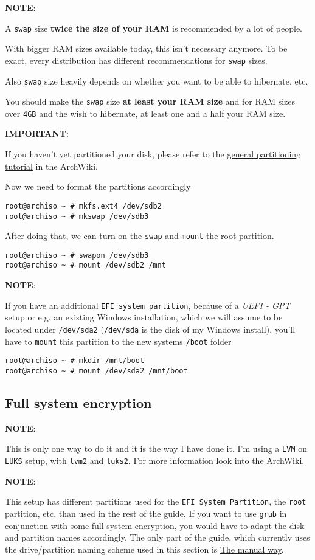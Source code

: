 \documentclass[9pt]{report}
\newcommand{\admonition}[2]{\textbf{#1}: {#2}}
\begin{document}
\admonition{NOTE}{A \texttt{swap} size \textbf{twice the size of your RAM} is recommended by a lot of people.


With bigger RAM sizes available today, this isn’t necessary anymore.
To be exact, every distribution has different recommendations for \texttt{swap} sizes.


Also \texttt{swap} size heavily depends on whether you want to be able to hibernate, etc.


You should make the \texttt{swap} size \textbf{at least your RAM size} and for RAM sizes over \texttt{4GB} and the wish to hibernate, at least one and a half your RAM size.

}
\admonition{IMPORTANT}{If you haven’t yet partitioned your disk, please refer to the \href{https://wiki.archlinux.org/index.php/Partitioning}{general partitioning tutorial} in the ArchWiki.

}
Now we need to format the partitions accordingly


\begin{verbatim}
root@archiso ~ # mkfs.ext4 /dev/sdb2
root@archiso ~ # mkswap /dev/sdb3
\end{verbatim}

After doing that, we can turn on the \texttt{swap} and \texttt{mount} the root partition.


\begin{verbatim}
root@archiso ~ # swapon /dev/sdb3
root@archiso ~ # mount /dev/sdb2 /mnt
\end{verbatim}

\admonition{NOTE}{If you have an additional \texttt{EFI system partition}, because of a \emph{UEFI - GPT} setup or e.g. an existing Windows installation, which we will assume to be located under \texttt{/dev/sda2} (\texttt{/dev/sda} is the disk of my Windows install), you’ll have to \texttt{mount} this partition to the new systems \texttt{/boot} folder


}
\begin{verbatim}
root@archiso ~ # mkdir /mnt/boot
root@archiso ~ # mount /dev/sda2 /mnt/boot
\end{verbatim}

\vfill\eject

\hypertarget{x-full-system-encryption}{\subsection{Full system encryption}}
\admonition{NOTE}{This is only one way to do it and it is the way I have done it.
I’m using a \texttt{LVM} on \texttt{LUKS} setup, with \texttt{lvm2} and \texttt{luks2}.
For more information look into the \href{https://wiki.archlinux.org/}{ArchWiki}.

}
\admonition{NOTE}{This setup has different partitions used for the \texttt{EFI System Partition}, the \texttt{root} partition, etc. than used in the rest of the guide.
If you want to use \texttt{grub} in conjunction with some full system encryption, you would have to adapt the disk and partition names accordingly.
The only part of the guide, which currently uses the drive/partition naming scheme used in this section is \hyperlink{manual-secure-boot-setup}{The manual way}.

}
\end{document}
